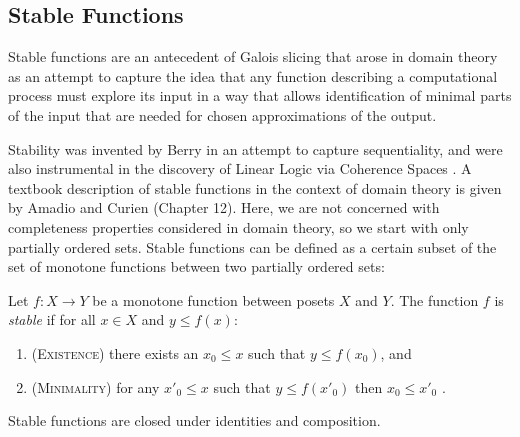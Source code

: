 \subsection{Stable Functions}
\label{sec:stable-functions}

Stable functions are an antecedent of Galois slicing that arose in
domain theory as an attempt to capture the idea that any function
describing a computational process must explore its input in a way
that allows identification of minimal parts of the input that are
needed for chosen approximations of the output.

Stability was invented by Berry \cite{berry86} in an attempt to capture
sequentiality, and were also instrumental in the discovery of Linear
Logic via Coherence Spaces \cite{girard}. A textbook description of
stable functions in the context of domain theory is given by Amadio
and Curien \cite{amadio-curien} (Chapter 12). Here, we are not
concerned with completeness properties considered in domain theory, so
we start with only partially ordered sets. Stable functions can be
defined as a certain subset of the set of monotone functions between
two partially ordered sets:

\begin{definition}
  Let $f : X \to Y$ be a monotone function between posets $X$ and
  $Y$. The function $f$ is \emph{stable} if for all $x \in X$ and
  $y \leq f(x)$:
  \begin{enumerate}
  \item (\textsc{Existence}) there exists an $x_0 \leq x$ such that $y \leq f(x_0)$, and
  \item (\textsc{Minimality}) for any $x'_0 \leq x$ such that $y \leq f(x'_0)$ then
    $x_0 \leq x'_0$ .
  \end{enumerate}
\end{definition}

\begin{lemma}
  Stable functions are closed under identities and composition.
\end{lemma}

